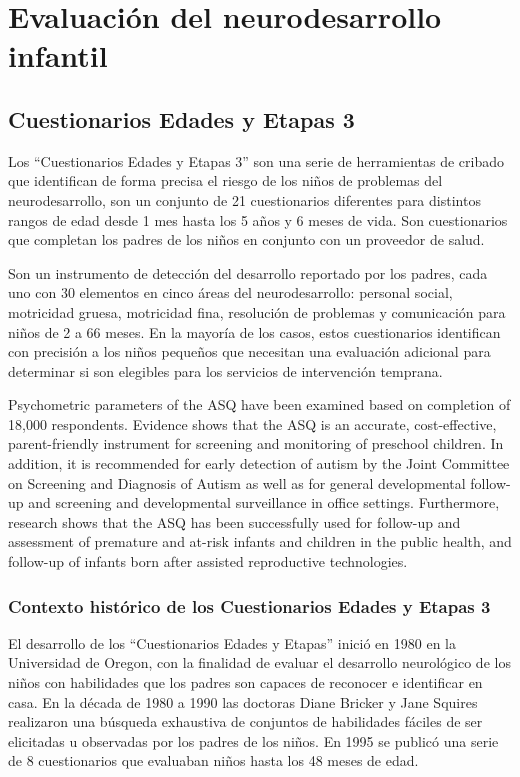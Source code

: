 \section{Evaluación del neurodesarrollo infantil}
\subsection{Cuestionarios Edades y Etapas 3}
Los ``Cuestionarios Edades y Etapas 3'' son una serie de herramientas de
cribado que identifican de forma precisa el riesgo de los niños de problemas
del neurodesarrollo, son un conjunto de 21 cuestionarios diferentes para
distintos rangos de edad desde 1 mes hasta los 5 años y 6 meses de vida. Son
cuestionarios que completan los padres de los niños en conjunto con un
proveedor de salud. \cite{Singh2017}

Son un instrumento de detección del desarrollo reportado por los padres, cada
uno con 30 elementos en cinco áreas del neurodesarrollo: personal social,
motricidad gruesa, motricidad fina, resolución de problemas y comunicación para
niños de 2 a 66 meses. En la mayoría de los casos, estos cuestionarios
identifican con precisión a los niños pequeños que necesitan una evaluación
adicional para determinar si son elegibles para los servicios de intervención
temprana. \cite{Singh2017}

Psychometric parameters of the ASQ have been examined based on completion of
18,000 respondents. \cite{squires2009ages} Evidence shows that the ASQ is an
accurate, cost-effective, parent-friendly instrument for screening and
monitoring of preschool children. In addition, it is recommended for early
detection of autism by the Joint Committee on Screening and Diagnosis of Autism
as well as for general developmental follow-up and screening and developmental
surveillance in office settings. Furthermore, research shows that the ASQ has
been successfully used for follow-up and assessment of premature and at-risk
infants and children in the public health, and follow-up of infants born after
assisted reproductive technologies. \cite{Chiu2010, Yu2007}

\subsubsection{Contexto histórico de los Cuestionarios Edades y Etapas 3}
El desarrollo de los ``Cuestionarios Edades y Etapas'' inició en 1980 en la
Universidad de Oregon, con la finalidad de evaluar el desarrollo neurológico de
los niños con habilidades que los padres son capaces de reconocer e identificar
en casa. En la década de 1980 a 1990 las doctoras Diane Bricker y Jane Squires
realizaron una búsqueda exhaustiva de conjuntos de habilidades fáciles de ser
elicitadas u observadas por los padres de los niños. En 1995 se publicó una
serie de 8 cuestionarios que evaluaban niños hasta los 48 meses de edad.
\cite{ASQ4decades}

